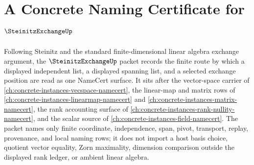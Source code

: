 \chapter{A Concrete Naming Certificate for $\SteinitzExchangeUp$}
\label{ch:concrete-instances-steinitz-exchange-namecert}

Following Steinitz and the standard finite-dimensional linear algebra exchange argument, the $\SteinitzExchangeUp$ packet records the finite route by which a displayed independent list, a displayed spanning list, and a selected exchange position are read as one NameCert surface. It sits after the vector-space carrier of \autoref{ch:concrete-instances-vecspace-namecert}, the linear-map and matrix rows of \autoref{ch:concrete-instances-linearmap-namecert} and \autoref{ch:concrete-instances-matrix-namecert}, the rank accounting surface of \autoref{ch:concrete-instances-rank-nullity-namecert}, and the scalar source of \autoref{ch:concrete-instances-field-namecert}. The packet names only finite coordinate, independence, span, pivot, transport, replay, provenance, and local naming rows; it does not import a host basis choice, quotient vector equality, Zorn maximality, dimension comparison outside the displayed rank ledger, or ambient linear algebra.

